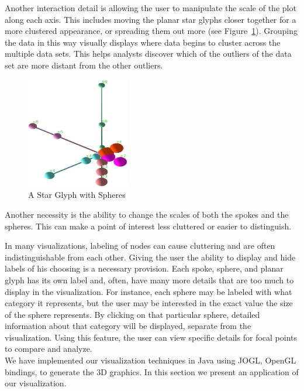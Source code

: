 \documentclass[]{article}
\begin{document}
Another interaction detail is allowing the user to manipulate the scale of the plot along each axis.  This includes moving the planar star glyphs closer together for a more clustered appearance, or spreading them out more (see Figure~\ref{fig:grouped}). Grouping the data in this way visually displays where data begins to cluster across the multiple data sets. This helps analysts discover which of the outliers of the data set are more distant from the other outliers.

\begin{figure}[htb]
\begin{center}
\includegraphics[width=0.4\textwidth, keepaspectratio=true]{images/grouped}
\end{center}
\caption{A Star Glyph with Spheres}
\label {fig:grouped}
\end{figure}

Another necessity is the ability to change the scales of both the spokes and the spheres.  This can make a point of interest less cluttered or easier to distinguish. 

In many visualizations, labeling of nodes can cause cluttering and are often indistinguishable from each other.  Giving the user the ability to display and hide labels of his choosing is a necessary provision.  Each spoke, sphere, and planar glyph has its own label and, often, have many more details that are too much to display in the visualization.  For instance, each sphere may be labeled with what category it represents, but the user may be interested in the exact value the size of the sphere represents.  By clicking on that particular sphere, detailed information about that category will be displayed, separate from the visualization.  Using this feature, the user can view specific details for focal points to compare and analyze.\\

We have implemented our visualization techniques in Java using JOGL, OpenGL bindings, to generate the 3D graphics. In this section we present an application of our visualization.\\
\end{document}
